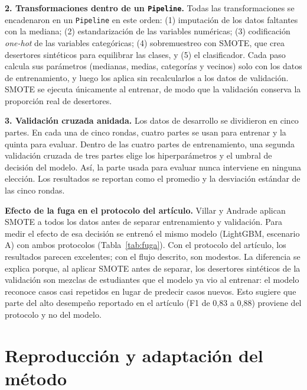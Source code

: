 \documentclass[11pt,a4paper]{article}
\begin{document}
\textbf{2. Transformaciones dentro de un \texttt{Pipeline}.} Todas las transformaciones se encadenaron en un \texttt{Pipeline} en este orden: (1) imputación de los datos faltantes con la mediana; (2) estandarización de las variables numéricas; (3) codificación \textit{one-hot} de las variables categóricas; (4) sobremuestreo con SMOTE, que crea desertores sintéticos para equilibrar las clases, y (5) el clasificador. Cada paso calcula sus parámetros (medianas, medias, categorías y vecinos) solo con los datos de entrenamiento, y luego los aplica sin recalcularlos a los datos de validación. SMOTE se ejecuta únicamente al entrenar, de modo que la validación conserva la proporción real de desertores.

\textbf{3. Validación cruzada anidada.} Los datos de desarrollo se dividieron en cinco partes. En cada una de cinco rondas, cuatro partes se usan para entrenar y la quinta para evaluar. Dentro de las cuatro partes de entrenamiento, una segunda validación cruzada de tres partes elige los hiperparámetros y el umbral de decisión del modelo. Así, la parte usada para evaluar nunca interviene en ninguna elección. Los resultados se reportan como el promedio y la desviación estándar de las cinco rondas.

\textbf{Efecto de la fuga en el protocolo del artículo.} Villar y Andrade aplican SMOTE a todos los datos antes de separar entrenamiento y validación. Para medir el efecto de esa decisión se entrenó el mismo modelo (LightGBM, escenario A) con ambos protocolos (Tabla~\ref{tab:fuga}). Con el protocolo del artículo, los resultados parecen excelentes; con el flujo descrito, son modestos. La diferencia se explica porque, al aplicar SMOTE antes de separar, los desertores sintéticos de la validación son mezclas de estudiantes que el modelo ya vio al entrenar: el modelo reconoce casos casi repetidos en lugar de predecir casos nuevos. Esto sugiere que parte del alto desempeño reportado en el artículo (F1 de 0,83 a 0,88) proviene del protocolo y no del modelo.

\begin{table}[H]
\centering
\small
\caption{Mismo modelo evaluado con los dos protocolos (escenario A, 5 rondas). El PR-AUC se explica en la Sección~4.}
\label{tab:fuga}

\end{table}

\section{Reproducción y adaptación del método}
\end{document}
